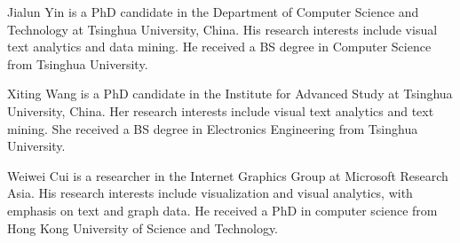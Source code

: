 \documentclass[10pt,journal,cspaper,compsoc]{IEEEtran}
\begin{document}
\vspace{-8mm}
\begin{IEEEbiography}{Jialun Yin} is a PhD candidate in the Department of Computer Science and Technology at Tsinghua University, China.
His research interests include visual text analytics and data mining.
He received a BS degree in Computer Science from Tsinghua University.
\vspace{-8mm}
\end{IEEEbiography}

\vspace{-8mm}
\begin{IEEEbiography}{Xiting Wang} is a PhD candidate in the Institute for Advanced Study at Tsinghua University, China.
Her research interests include visual text analytics and text mining.
She received a BS degree in Electronics Engineering from Tsinghua University.
\vspace{-8mm}
\end{IEEEbiography}

\vspace{-8mm}
\begin{IEEEbiography}{Weiwei Cui}
is a researcher in the Internet Graphics Group at Microsoft Research Asia.
His research interests include visualization and visual analytics, with emphasis on text and graph data.
He received a PhD in computer science from Hong Kong University of Science and Technology.


%
\vspace{-8mm}
\end{IEEEbiography}
\end{document}
